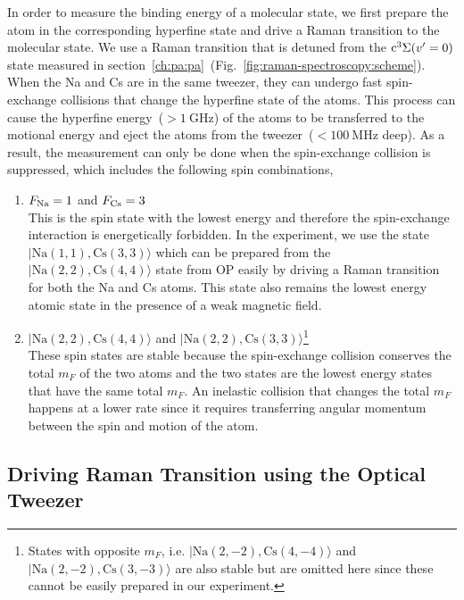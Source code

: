 In order to measure the binding energy of a molecular state,
we first prepare the atom in the corresponding hyperfine state
and drive a Raman transition to the molecular state.
We use a Raman transition that is detuned from
the $\mathrm{c^3\Sigma}{\left({v'=0}\right)}$ state
measured in section~\ref{ch:pa:pa}~(Fig.~\ref{fig:raman-spectroscopy:scheme}).
When the Na and Cs are in the same tweezer,
they can undergo fast spin-exchange collisions that change the hyperfine state of the atoms.
This process can cause the hyperfine energy~($>\!1~\mathrm{GHz}$) of the atoms
to be transferred to the motional energy
and eject the atoms from the tweezer~($<\!100~\mathrm{MHz}$ deep).
As a result, the measurement can only be done when the spin-exchange collision is suppressed,
which includes the following spin combinations,
\begin{enumerate}
\item $F_{\mathrm{Na}}=1$ and $F_{\mathrm{Cs}}=3$\\
  This is the spin state with the lowest energy and therefore the spin-exchange interaction
  is energetically forbidden.
  In the experiment, we use the state $|\mathrm{Na(1, 1),Cs(3, 3)}\rangle$
  which can be prepared from the $|\mathrm{Na(2, 2),Cs(4, 4)}\rangle$ state from OP
  easily by driving a Raman transition for both the Na and Cs atoms.
  This state also remains the lowest energy atomic state
  in the presence of a weak magnetic field.
\item $|\mathrm{Na(2, 2),Cs(4, 4)}\rangle$ and $|\mathrm{Na(2, 2),Cs(3, 3)}\rangle$\footnote{
    States with opposite $m_F$, i.e.
    $|\mathrm{Na(2, -2),Cs(4, -4)}\rangle$ and $|\mathrm{Na(2, -2),Cs(3, -3)}\rangle$
    are also stable
    but are omitted here since these cannot be easily prepared in our experiment.}\\
  These spin states are stable because the spin-exchange collision conserves the total $m_F$
  of the two atoms and
  the two states are the lowest energy states that have the same total $m_F$.
  An inelastic collision that changes the total $m_F$ happens at a lower rate
  since it requires transferring angular momentum between the spin and motion of the atom.
\end{enumerate}

\subsection{Driving Raman Transition using the Optical Tweezer}
\label{ch:raman-spectroscopy:states:raman-tweezer}


